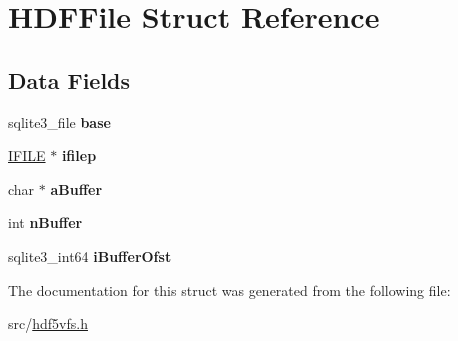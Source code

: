 \hypertarget{structHDFFile}{}\section{H\+D\+F\+File Struct Reference}
\label{structHDFFile}
\subsection*{Data Fields}
\begin{DoxyCompactItemize}
\item 
\hypertarget{structHDFFile_a7d7a9d25909eaa65c2a0fa71f3c21fd7}{}sqlite3\+\_\+file {\bfseries base}\label{structHDFFile_a7d7a9d25909eaa65c2a0fa71f3c21fd7}

\item 
\hypertarget{structHDFFile_a78c6116ac12c51dc2e67d1e016d1859b}{}\hyperlink{structIFILE}{I\+F\+I\+L\+E} $\ast$ {\bfseries ifilep}\label{structHDFFile_a78c6116ac12c51dc2e67d1e016d1859b}

\item 
\hypertarget{structHDFFile_a909f9e9935ccc467b987fd4d8504c34d}{}char $\ast$ {\bfseries a\+Buffer}\label{structHDFFile_a909f9e9935ccc467b987fd4d8504c34d}

\item 
\hypertarget{structHDFFile_abf245b3b1bf99b5fa8ddf8b0152295f1}{}int {\bfseries n\+Buffer}\label{structHDFFile_abf245b3b1bf99b5fa8ddf8b0152295f1}

\item 
\hypertarget{structHDFFile_af76ef6eae11da5f1af3ab0cb04e431ec}{}sqlite3\+\_\+int64 {\bfseries i\+Buffer\+Ofst}\label{structHDFFile_af76ef6eae11da5f1af3ab0cb04e431ec}

\end{DoxyCompactItemize}


The documentation for this struct was generated from the following file\+:\begin{DoxyCompactItemize}
\item 
src/\hyperlink{hdf5vfs_8h}{hdf5vfs.\+h}\end{DoxyCompactItemize}
